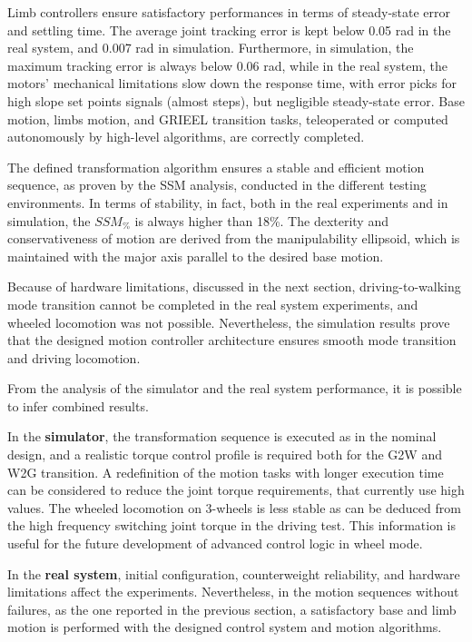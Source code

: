 Limb controllers ensure satisfactory performances in terms of steady-state error and settling time. The average joint tracking error is kept below 0.05 rad in the real system, and 0.007 rad in simulation. Furthermore, in simulation, the maximum tracking error is always below 0.06 rad, while in the real system, the motors' mechanical limitations slow down the response time, with error picks for high slope set points signals (almost steps), but negligible steady-state error.    
Base motion, limbs motion, and GRIEEL transition tasks, teleoperated or computed autonomously by high-level algorithms, are correctly completed. 

The defined transformation algorithm ensures a stable and efficient motion sequence, as proven by the SSM analysis, conducted in the different testing environments.
In terms of stability, in fact, both in the real experiments and in simulation, the $SSM_\%$ is always higher than 18\%. The dexterity and conservativeness of motion are derived from the manipulability ellipsoid, which is maintained with the major axis parallel to the desired base motion. 

Because of hardware limitations, discussed in the next section, driving-to-walking mode transition cannot be completed in the real system experiments, and wheeled locomotion was not possible. Nevertheless, the simulation results prove that the designed motion controller architecture ensures smooth mode transition and driving locomotion. 

From the analysis of the simulator and the real system performance, it is possible to infer combined results.

In the \textbf{simulator}, the transformation sequence is executed as in the nominal design, and a realistic torque control profile is required both for the G2W and W2G transition. A redefinition of the motion tasks with longer execution time can be considered to reduce the joint torque requirements, that currently use high values. 
The wheeled locomotion on 3-wheels is less stable as can be deduced from the high frequency switching joint torque in the driving test. This information is useful for the future development of advanced control logic in wheel mode. 

In the \textbf{real system}, initial configuration, counterweight reliability, and hardware limitations affect the experiments. Nevertheless, in the motion sequences without failures, as the one reported in the previous section, a satisfactory base and limb motion is performed with the designed control system and motion algorithms. 

